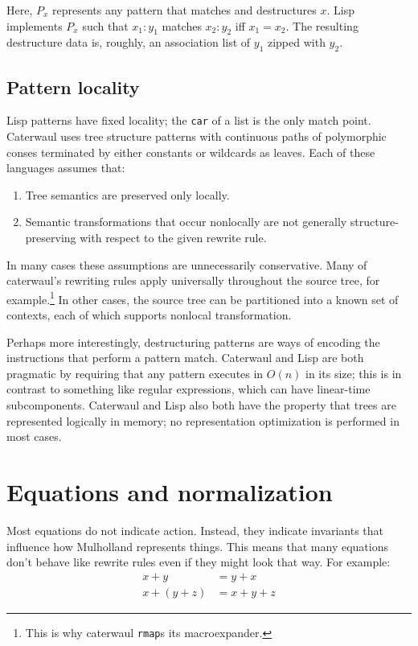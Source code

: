 \documentclass{report}
\begin{document}
  Here, $P_x$ represents any pattern that matches and destructures $x$. Lisp implements $P_x$ such that $x_1:y_1$ matches $x_2:y_2$ iff $x_1 = x_2$. The resulting destructure data is, roughly,
  an association list of $y_1$ zipped with $y_2$.

\section{Pattern locality}
    Lisp patterns have fixed locality; the {\tt car} of a list is the only match point. Caterwaul uses tree structure patterns with continuous paths of polymorphic conses terminated by either
    constants or wildcards as leaves. Each of these languages assumes that:

\begin{enumerate}
\item{Tree semantics are preserved only locally.}
\item{Semantic transformations that occur nonlocally are not generally structure-preserving with respect to the given rewrite rule.}
\end{enumerate}

    In many cases these assumptions are unnecessarily conservative. Many of caterwaul's rewriting rules apply universally throughout the source tree, for example.\footnote{This is why
    caterwaul {\tt rmap}s its macroexpander.} In other cases, the source tree can be partitioned into a known set of contexts, each of which supports nonlocal transformation.

    Perhaps more interestingly, destructuring patterns are ways of encoding the instructions that perform a pattern match. Caterwaul and Lisp are both pragmatic by requiring that any pattern
    executes in $O(n)$ in its size; this is in contrast to something like regular expressions, which can have linear-time subcomponents. Caterwaul and Lisp also both have the property that
    trees are represented logically in memory; no representation optimization is performed in most cases.

\chapter{Equations and normalization}
  Most equations do not indicate action. Instead, they indicate invariants that influence how Mulholland represents things. This means that many equations don't behave like rewrite rules even
  if they might look that way. For example:
\begin{align*}
x + y       & = y + x \\
x + (y + z) & = x + y + z
\end{align*}
\end{document}
